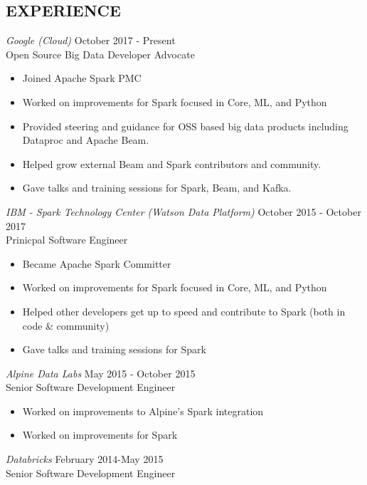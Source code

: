 \documentclass[10pt,line,margin=0.1]{newsres}
\begin{document}
\begin{resume}
\section{EXPERIENCE}
        {\sl Google (Cloud)} \hfill October 2017 - Present\\
        Open Source Big Data Developer Advocate
        \begin{itemize}  \itemsep -2pt %
          \item Joined Apache Spark PMC
          \item Worked on improvements for Spark focused in Core, ML, and Python
          \item Provided steering and guidance for OSS based big data products including Dataproc and Apache Beam.
          \item Helped grow external Beam and Spark contributors and community.
          \item Gave talks and training sessions for Spark, Beam, and Kafka.
        \end{itemize}
            {\sl IBM - Spark Technology Center (Watson Data Platform)} \hfill October 2015 - October 2017\\
        Prinicpal Software Engineer
        \begin{itemize}  \itemsep -2pt %
          \item Became Apache Spark Committer
          \item Worked on improvements for Spark focused in Core, ML, and Python
          \item Helped other developers get up to speed and contribute to Spark (both in code \& community)
          \item Gave talks and training sessions for Spark
        \end{itemize}
        {\sl Alpine Data Labs} \hfill May 2015 - October 2015\\
        Senior Software Development Engineer
        \begin{itemize}  \itemsep -2pt %
          \item Worked on improvements to Alpine's Spark integration
          \item Worked on improvements for Spark
        \end{itemize}
      {\sl Databricks} \hfill February 2014-May 2015\\
        Senior Software Development Engineer
        \begin{itemize}  \itemsep -2pt %

\end{itemize}
\end{resume}
\end{document}
